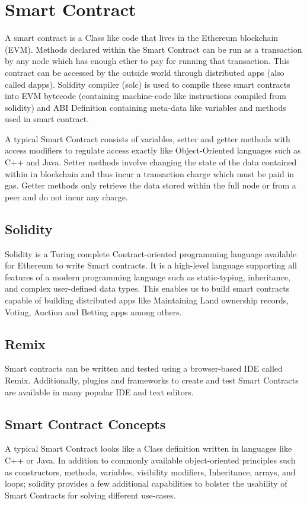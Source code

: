 \documentclass[11pt,openright]{report}
\begin{document}
\section{Smart Contract}
A smart contract is a Class like code that lives in the Ethereum blockchain (EVM). Methods declared within the Smart Contract can be run as a transaction by any node which has enough ether to pay for running that transaction. This contract can be accessed by the outside world through distributed apps (also called dapps). Solidity compiler (solc) is used to compile these smart contracts into EVM bytecode (containing machine-code like instructions compiled from solidity) and ABI Definition containing meta-data like variables and methods used in smart contract.

A typical Smart Contract consists of variables, setter and getter methods with access modifiers to regulate access exactly like Object-Oriented languages such as C++ and Java. Setter methods involve changing the state of the data contained within in blockchain and thus incur a transaction charge which must be paid in gas. Getter methods only retrieve the data stored within the full node or from a peer and do not incur any charge.

\subsection{Solidity}
Solidity is a Turing complete Contract-oriented programming language available for Ethereum to write Smart contracts. It is a high-level language supporting all features of a modern programming language such as static-typing, inheritance, and complex user-defined data types. This enables us to build smart contracts capable of building distributed apps like Maintaining Land ownership records, Voting, Auction and Betting apps among others.

\subsection{Remix}
Smart contracts can be written and tested using a browser-based IDE called Remix. Additionally, plugins and frameworks to create and test Smart Contracts are available in many popular IDE and text editors.

\subsection{Smart Contract Concepts}
A typical Smart Contract looks like a Class definition written in languages like C++ or Java. In addition to commonly available object-oriented principles such as constructors, methods, variables, visibility modifiers, Inheritance, arrays, and loops; solidity provides a few additional capabilities to bolster the usability of Smart Contracts for solving different use-cases.
\end{document}
